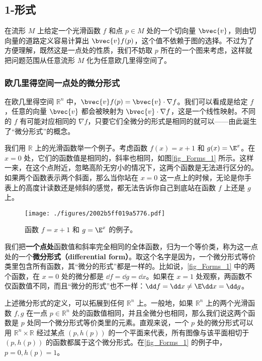 

\subsection{1-形式}

在流形 $M$ 上给定一个光滑函数 $f$ 和点 $p\in M$ 处的一个切向量 $\bvec{v}$，则由切向量的道路定义容易计算出 $\bvec{v}f(p)$，这个值不依赖于图的选择。不过为了方便理解，既然这是一点处的性质，我们不妨取 $p$ 所在的一个图来考虑，这样就把问题范围从任意流形 $M$ 化为任意欧几里得空间了。

\subsubsection{欧几里得空间一点处的微分形式}



在欧几里得空间 $\mathbb{R}^n$ 中，$\bvec{v}f(p)=\bvec{v}\cdot\nabla f$。我们可以看成是给定 $f$，任意的向量 $\bvec{v}$ 都会被映射为 $\bvec{v}\cdot\nabla f$，这是一个线性映射。不同的 $f$ 有可能对应相同的 $\nabla f$，只要它们全微分的形式是相同的就可以——由此诞生了“微分形式”的概念。

我们用 $\mathbb{R}$ 上的光滑函数举一个例子。考虑函数 $f(x)=x+1$ 和 $g(x)=\E^x$。在 $x=0$ 处，它们的函数值是相同的，斜率也相同，如图\autoref{fig_Forms_1} 所示。这样一来，在这个点附近，忽略高阶无穷小的情况下，这两个函数是无法进行区分的。如果两个函数表示两个斜面，那么当你站在 $x=0$ 这一点上的时候，无论是你手表上的高度计读数还是倾斜的感觉，都无法告诉你自己到底站在函数 $f$ 上还是 $g$ 上。

\begin{figure}[ht]
\centering
\texttt{[image: ./figures/2002b5ff019a5776.pdf]}
\caption{函数 $f=x+1$ 和 $g=\E^x$ 的例子。} \label{fig_Forms_1}
\end{figure}

我们把\textbf{一个点处}函数值和斜率完全相同的全体函数，归为一个等价类，称为这一点处的一个\textbf{微分形式（differential form）}。取这个名字是因为，一个微分形式等价类里包含所有函数，其“微分的形式”都是一样的。比如说，\autoref{fig_Forms_1} 中的两个函数，在 $x=0$ 处的微分都是 $\dd f=\dd g=\dd x$。如果在 $x=1$ 处观察，两函数不仅函数值不同，而且“微分的形式”也不一样：$\dd f=\dd x\not=\E\dd x=\dd g$。

上述微分形式的定义，可以拓展到任何 $\mathbb{R}^n$ 上。一般地，如果 $\mathbb{R}^n$ 上的两个光滑函数 $f, g$ 在一点 $p\in\mathbb{R}^n$ 处的函数值相同，并且全微分也相同，那么我们说这两个函数是 $p$ 处同一个微分形式等价类里的元素。直观来说，一个 $p$ 处的微分形式可以用 $\mathbb{R}^n\times\mathbb{R}$ 经过某点 $(p, h(p))$ 的一个平面来代表，所有图像与该平面相切于 $(p, h(p))$ 的函数都属于这个微分形式。在\autoref{fig_Forms_1} 的例子中，$p=0, h(p)=1$。

